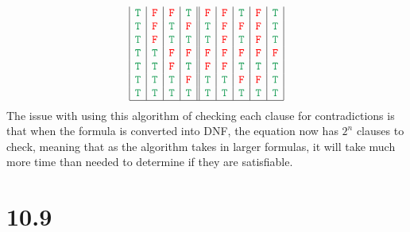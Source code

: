 \documentclass{article}
\begin{document}
\[\begin{array}{|c|c|c|c||c|c|c|c|c|}
\textcolor{ForestGreen}{\tt{T}}&\textcolor{red}{\tt{F}}&\textcolor{red}{\tt{F}}&\textcolor{ForestGreen}{\tt{T}}&\textcolor{red}{\tt{F}}&\textcolor{red}{\tt{F}}&\textcolor{ForestGreen}{\tt{T}}&\textcolor{red}{\tt{F}}&\textcolor{ForestGreen}{\tt{T}}\\
\textcolor{ForestGreen}{\tt{T}}&\textcolor{red}{\tt{F}}&\textcolor{ForestGreen}{\tt{T}}&\textcolor{red}{\tt{F}}&\textcolor{ForestGreen}{\tt{T}}&\textcolor{red}{\tt{F}}&\textcolor{red}{\tt{F}}&\textcolor{red}{\tt{F}}&\textcolor{ForestGreen}{\tt{T}}\\
\textcolor{ForestGreen}{\tt{T}}&\textcolor{red}{\tt{F}}&\textcolor{ForestGreen}{\tt{T}}&\textcolor{ForestGreen}{\tt{T}}&\textcolor{ForestGreen}{\tt{T}}&\textcolor{red}{\tt{F}}&\textcolor{ForestGreen}{\tt{T}}&\textcolor{red}{\tt{F}}&\textcolor{ForestGreen}{\tt{T}}\\
\textcolor{ForestGreen}{\tt{T}}&\textcolor{ForestGreen}{\tt{T}}&\textcolor{red}{\tt{F}}&\textcolor{red}{\tt{F}}&\textcolor{red}{\tt{F}}&\textcolor{red}{\tt{F}}&\textcolor{red}{\tt{F}}&\textcolor{red}{\tt{F}}&\textcolor{red}{\tt{F}}\\
\textcolor{ForestGreen}{\tt{T}}&\textcolor{ForestGreen}{\tt{T}}&\textcolor{red}{\tt{F}}&\textcolor{ForestGreen}{\tt{T}}&\textcolor{red}{\tt{F}}&\textcolor{red}{\tt{F}}&\textcolor{ForestGreen}{\tt{T}}&\textcolor{ForestGreen}{\tt{T}}&\textcolor{ForestGreen}{\tt{T}}\\
\textcolor{ForestGreen}{\tt{T}}&\textcolor{ForestGreen}{\tt{T}}&\textcolor{ForestGreen}{\tt{T}}&\textcolor{red}{\tt{F}}&\textcolor{ForestGreen}{\tt{T}}&\textcolor{ForestGreen}{\tt{T}}&\textcolor{red}{\tt{F}}&\textcolor{red}{\tt{F}}&\textcolor{ForestGreen}{\tt{T}}\\
\textcolor{ForestGreen}{\tt{T}}&\textcolor{ForestGreen}{\tt{T}}&\textcolor{ForestGreen}{\tt{T}}&\textcolor{ForestGreen}{\tt{T}}&\textcolor{ForestGreen}{\tt{T}}&\textcolor{ForestGreen}{\tt{T}}&\textcolor{ForestGreen}{\tt{T}}&\textcolor{ForestGreen}{\tt{T}}&\textcolor{ForestGreen}{\tt{T}}\\
\hline
\end{array}\]
The issue with using this algorithm of checking each clause for contradictions is that when the formula is converted into DNF, the equation now has $2^n$ clauses to check, meaning that as the algorithm takes in larger formulas, it will take much more time than needed to determine if they are satisfiable.
\section*{10.9}
\end{document}

